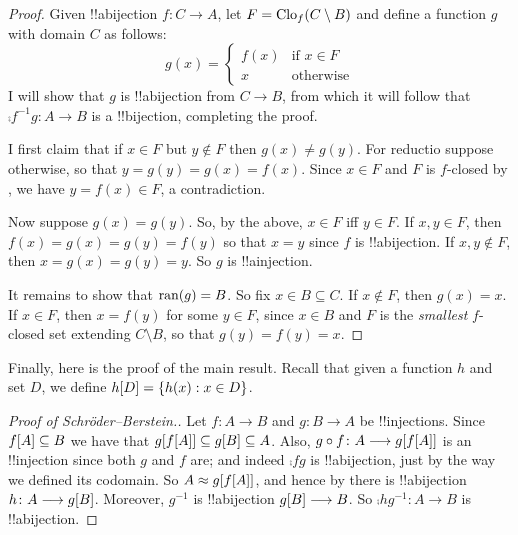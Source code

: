 \documentclass[../../../include/open-logic-section]{subfiles}
\begin{document}
\begin{proof}
Given !!a{bijection}  $f \colon C \to A$, let $F =
\Closureofunder{f}{C \setminus B}$ and define a function $g$ with
domain $C$ as follows:
\[
	g(x) = 
	\begin{cases}
			f(x) &\text{if $x \in F$}\\
			x & \text{otherwise}
		\end{cases}
\]
I will show that $g$ is !!a{bijection} from $C \to B$, from which it
will follow that $\comp{f^{-1}}{g} \colon A \to B$ is a !!{bijection},
completing the proof.

I first claim that if $x \in F$ but $y\notin F$ then $g(x) \neq g(y)$.
For reductio suppose otherwise, so that $y = g(y) = g(x) = f(x)$.
Since $x \in F$ and $F$ is $f$-closed by , we have
$y = f(x) \in F$, a contradiction. 

Now suppose $g(x) = g(y)$. So, by the above, $x \in F$ iff $y \in F$.
If $x, y \in F$, then $f(x) = g (x) = g(y) = f(y)$ so that $x = y$
since $f$ is !!a{bijection}. If  $x, y \notin F$, then $x = g(x) =
g(y) = y$. So $g$ is !!a{injection}.

It remains to show that $\ran{g} = B$. So fix $x \in B \subseteq C$.
If $x \notin F$, then $g(x) = x$. If $x \in F$, then $x = f(y)$ for
some $y \in F$, since $x \in B$ and $F$ is the \emph{smallest}
$f$-closed set extending $C \setminus B$, so that $g(y) = f(y) = x$.
\end{proof}

Finally, here is the proof of the main result. Recall that given a
function $h$ and set $D$, we define $\funimage{h}{D} = \Setabs{h(x)}{x
\in D}$. 

\begin{proof}[Proof of Schr\"oder--Berstein.] Let $f \colon A \to B$
and $g \colon B \to A$ be !!{injection}s. Since $\funimage{f}{A}
\subseteq B$ we have that $\funimage{g}{\funimage{f}{A}} \subseteq
g[B] \subseteq A$. Also, $\comp{f}{g} \colon A \to
\funimage{g}{\funimage{f}{A}}$ is an !!{injection} since both $g$ and
$f$ are; and indeed $\comp{f}{g}$ is !!a{bijection}, just by the way
we defined its codomain. So
$\cardeq{A}{\funimage{g}{\funimage{f}{A}}}$, and hence by
 there is !!a{bijection} $h \colon A \to
\funimage{g}{B}$. Moreover, $g^{-1}$ is !!a{bijection}
$\funimage{g}{B} \to B$. So $\comp{h}{g^{-1}} \colon A \to B$ is
!!a{bijection}. 
\end{proof}
\end{document}
